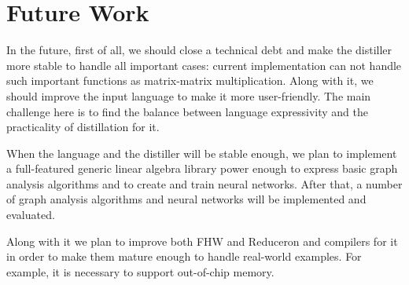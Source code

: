 \section{Future Work}

In the future, first of all, we should close a technical debt and make the distiller more stable to handle all important cases: current implementation can not handle such important functions as matrix-matrix multiplication.
Along with it, we should improve the input language to make it more user-friendly.
The main challenge here is to find the balance between language expressivity and the practicality of distillation for it.

When the language and the distiller will be stable enough, we plan to implement a full-featured generic linear algebra library power enough to express basic graph analysis algorithms and to create and train neural networks.
After that, a number of graph analysis algorithms and neural networks will be implemented and evaluated.

Along with it we plan to improve both FHW and Reduceron and compilers for it in order to make them mature enough to handle real-world examples.
For example, it is necessary to support out-of-chip memory.